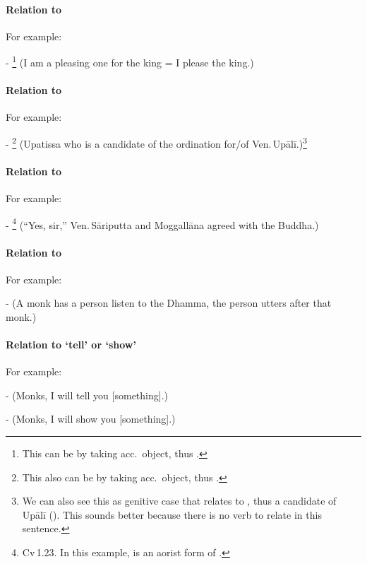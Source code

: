 \paragraph*{Relation to } For example:\par
- \footnote{This can be  by taking acc.\ object, thus .} (I am a pleasing one for the king = I please the king.)\par
								 
\paragraph*{Relation to } For example:\par
- \footnote{This also can be  by taking acc.\ object, thus .} (Upatissa who is a candidate of the ordination for/of Ven.\,Up\=al\=i.)\footnote{We can also see this as genitive case that relates  to , thus a candidate of Up\=al\=i (). This sounds better because there is no verb to relate in this sentence.}\par
								 
\paragraph*{Relation to } For example:\par
- \footnote{Cv\,1.23. In this example,  is an aorist form of .} (``Yes, sir,'' Ven.\,S\=ariputta and Moggall\=ana agreed with the Buddha.)\par
								 
\paragraph*{Relation to } For example:\par
-  (A monk has a person listen to the Dhamma, the person utters after that monk.)\par
								 
\paragraph*{Relation to `tell' or `show'} For example:\par
-  (Monks, I will tell you [something].)\par
-  (Monks, I will show you [something].)\par
								 
